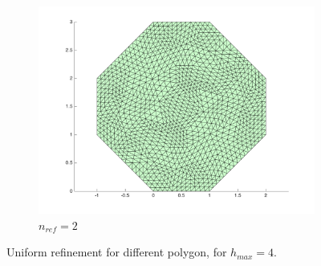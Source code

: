 \documentclass[10pt]{article}
\begin{document}
\begin{figure}[H]
\begin{subfigure}[b]{0.35\textwidth}
                \includegraphics[width=\textwidth]{refine-A2.png}
                \caption{\(n_{ref}=2\)}
        \end{subfigure}%
        \caption{Uniform refinement for different polygon, for \(h_{max}=4\).}
        \label{fig:stop}
\end{figure}
\end{document}
